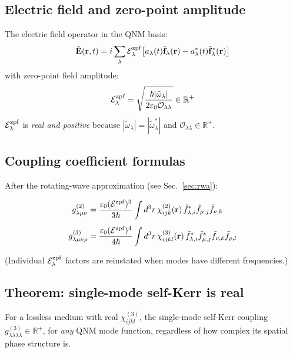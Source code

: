 \documentclass[12pt]{article}
\newcommand{\zpf}{{\rm zpf}}
\newcommand{\tf}{\tilde{\mathbf{f}}}
\newcommand{\tomega}{\tilde{\omega}}
\begin{document}
\subsection{Electric field and zero-point amplitude}

The electric field operator in the QNM basis:
\begin{equation}
  \hat{\mathbf{E}}(\mathbf{r},t) = i\sum_\lambda\mathcal{E}_\lambda^\zpf
  \bigl[a_\lambda(t)\tf_\lambda(\mathbf{r})
  -a_\lambda^*(t)\tf_\lambda^*(\mathbf{r})\bigr]
  \label{eq:E_field}
\end{equation}
with zero-point field amplitude:
\begin{equation}
  \mathcal{E}_\lambda^\zpf =
  \sqrt{\frac{\hbar|\tomega_\lambda|}{2\varepsilon_0\mathcal{O}_{\lambda\lambda}}}
  \in\mathbb{R}^+
  \label{eq:Ezpf}
\end{equation}
$\mathcal{E}_\lambda^\zpf$ is \emph{real and positive} because
$|\tomega_\lambda|=|\tomega_\lambda^*|$ and
$\mathcal{O}_{\lambda\lambda}\in\mathbb{R}^+$.

\subsection{Coupling coefficient formulas}

After the rotating-wave approximation (see Sec.~\ref{sec:rwa}):
\begin{keyresult}
\begin{align}
  g^{(2)}_{\lambda\mu\nu} &=
  \frac{\varepsilon_0(\mathcal{E}^\zpf)^3}{3\hbar}
  \int d^3r\,\chi^{(2)}_{ijk}(\mathbf{r})\,
  \tilde{f}_{\lambda,i}^*\tilde{f}_{\mu,j}\tilde{f}_{\nu,k}
  \label{eq:g2}\\[4pt]
  g^{(3)}_{\lambda\mu\nu\rho} &=
  \frac{\varepsilon_0(\mathcal{E}^\zpf)^4}{4\hbar}
  \int d^3r\,\chi^{(3)}_{ijkl}(\mathbf{r})\,
  \tilde{f}_{\lambda,i}^*\tilde{f}_{\mu,j}^*\tilde{f}_{\nu,k}\tilde{f}_{\rho,l}
  \label{eq:g3}
\end{align}
\end{keyresult}
(Individual $\mathcal{E}_\lambda^\zpf$ factors are reinstated when modes
have different frequencies.)

\subsection{Theorem: single-mode self-Kerr is real}
\label{sec:selfkerr_real}

\begin{remark}
For a lossless medium with real $\chi^{(3)}_{ijkl}$, the single-mode
self-Kerr coupling $g^{(3)}_{\lambda\lambda\lambda\lambda}
\in\mathbb{R}^+$, for \emph{any} QNM mode function, regardless of how
complex its spatial phase structure is.
\end{remark}
\end{document}
